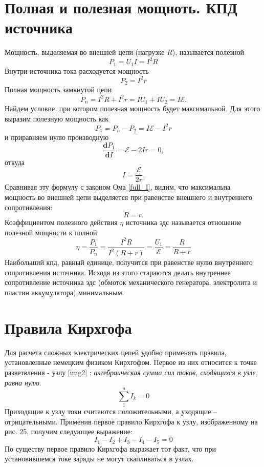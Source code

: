 \documentclass[a4paper,10pt]{book}
\begin{document}
\section{Полная и полезная мощноть. КПД источника}
Мощность, выделяемая во внешней цепи (нагрузке $R$), называется полезной
\begin{equation}
 P_1 = U_1I = I^2R\nonumber
\end{equation}
Внутри источника тока расходуется мощность 
\begin{equation}
 P_2 = I^2r\nonumber
\end{equation}
Полная мощность замкнутой цепи
\begin{equation}\label{full_P}
 P_n = I^2R + I^2r = IU_1 + IU_2 = I\mathcal{E}.
\end{equation}
Найдем условие, при котором полезная мощность будет максимальной. Для этого выразим полезную мощность как 
\begin{equation}
 P_1 = P_n - P_2 = I\mathcal{E} - I^2r\nonumber
\end{equation}
и приравняем нулю производную
\begin{equation}
 \frac{\mathbf{d}P_1}{\mathbf{d}I} = \mathcal{E} - 2Ir = 0,\nonumber
\end{equation}
откуда
\begin{equation}\label{profit_I}
 I = \frac{\mathcal{E}}{2r}.
\end{equation}
Сравнивая эту формулу с законом Ома \ref{full_I}, видим, что максимальна мощность во внешней цепи выделяется при равенстве внешнего и 
внутреннего сопротивления:
\begin{equation}\label{exeqin}
 R = r.
\end{equation}
Коэффициентом полезного действия $\eta$ источника эдс называется отношение полезной мощности к полной
\begin{equation}\label{nu}
 \eta = \frac{P_1}{P_n} = \frac{I^2R}{I^2(R + r)} = \frac{U_1}{\mathcal{E}} = \frac{R}{R + r}
\end{equation}
Наибольший кпд, равный единице, получится при равенстве нулю внутреннего сопротивления источника. Исходя из этого стараются делать внутреннее сопротивление источника эдс (обмоток механического генератора, электролита и пластин аккумулятора) минимальным.
\section{Правила Кирхгофа}
Для расчета сложных электрических цепей удобно применять правила, установленные немецким физиком Кирхгофом. Первое из них относится к точке разветвления - узлу \ref{img2} : \emph{алгебраическая сумма сил токов, сходящихся в узле, равна нулю}.
\begin{equation}\label{kirchgoff1}
 \sum_1^n I_k = 0
\end{equation}
Приходящие к узлу токи считаются положительными, а уходящие -- отрицательными. Применив первое правило Кирхгофа к узлу, изображенному на рис. 25, получим следующее выражение:
\begin{equation}
 I_1 - I_2 + I_3 - I_4 - I_5 = 0\nonumber
\end{equation}
По существу первое правило Кирхгофа выражает тот факт, что при установившемся токе заряды не могут скапливаться в узлах.
\end{document}
